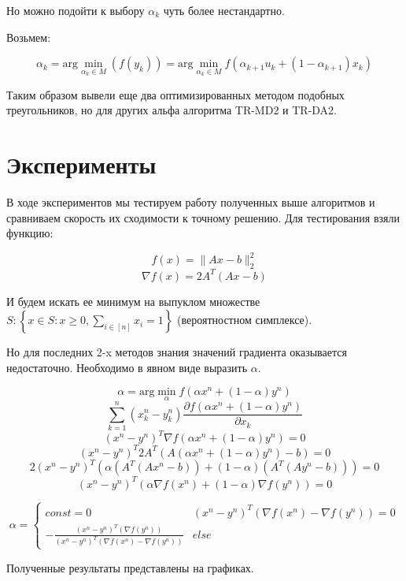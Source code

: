 \documentclass[a4paper,12pt]{article}
\theoremstyle{plain} %
\theoremstyle{definition} %
\theoremstyle{remark} %
\theoremstyle{definition}
\theoremstyle{definition}
\let\geq\geqslant
\begin{document}
	Но можно подойти к выбору $\alpha_k$ чуть более нестандартно.
	
	Возьмем:
	
	$$
	\alpha_k = \text{arg}\min\limits_{\alpha_k \in M}(f(y_k))=\text{arg}\min\limits_{\alpha_k \in M}f(\alpha_{k+1} u_k + (1-\alpha_{k+1}) x_k)
	$$
	
	Таким образом вывели еще два оптимизированных методом подобных треугольников, но для других альфа алгоритма TR-MD2 и TR-DA2.
	
	\section{Эксперименты}
	
	
    В ходе экспериментов мы тестируем работу полученных выше алгоритмов и сравниваем скорость их сходимости к точному решению. Для тестирования взяли функцию:
    
    $$
    f(x) = \|Ax - b\|_2^2
    $$
    $$
    \nabla f(x) = 2A^T(Ax-b)
    $$
	
	И будем искать ее минимум на выпуклом множестве $S : \left\{x \in S : x \geq 0, \sum\limits_{i \in [n]} x_i = 1\right\}$ (вероятностном симплексе).
	
	Но для последних 2-x методов знания значений градиента оказывается недостаточно. Необходимо в явном виде выразить $\alpha$.
	
	$$
	\alpha =\text{arg}\min\limits_{\alpha}f(\alpha x^n + (1-\alpha) y^n)
	$$
	$$
	\sum\limits_{k=1}^{n}(x_k^n-y_k^n)\frac{\partial f(\alpha x^n + (1-\alpha) y^n)}{\partial x_k}
	$$
	$$
	(x^n-y^n)^T \nabla f(\alpha x^n + (1-\alpha) y^n)=0
	$$
	$$
	(x^n-y^n)^T 2A^T(A(\alpha x^n + (1-\alpha) y^n)-b)=0
	$$
	$$
	2(x^n-y^n)^T (\alpha (A^T(A x^n -b)) + (1-\alpha)(A^T(A y^n-b)))=0
	$$
	$$
	(x^n-y^n)^T (\alpha \nabla f(x^n)  + (1-\alpha)\nabla f(y^n))=0
	$$
	
\begin{equation*}
\alpha= 
 \begin{cases}
   const = 0 & (x^n-y^n)^T (\nabla f(x^n) - \nabla f(y^n)) = 0\\
   -\frac{(x^n-y^n)^T (\nabla f(y^n))}{(x^n-y^n)^T (\nabla f(x^n) - \nabla f(y^n))} & else
 \end{cases}
\end{equation*}
	
	Полученные результаты представлены на графиках.
  
\end{document}
